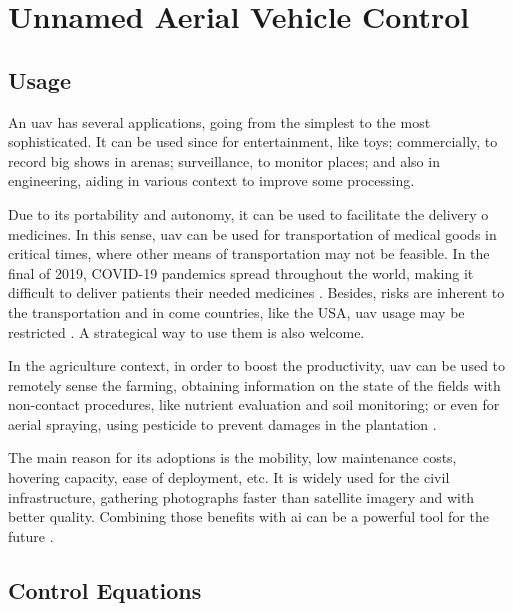 \section{Unnamed Aerial Vehicle Control}

\subsection{Usage}

An \gls*{uav} has several applications, going from the simplest to the most sophisticated. It can be used since for entertainment, like toys; commercially, to record big shows in arenas; surveillance, to monitor places; and also in engineering, aiding in various context to improve some processing.

Due to its portability and autonomy, it can be used to facilitate the delivery o medicines. In this sense, \gls*{uav} can be used for transportation of medical goods in critical times, where other means of transportation may not be feasible.
In the final of 2019, COVID-19 pandemics spread throughout the world, making it difficult to deliver patients their needed medicines \cite{ramakrishnan2023,mcphillips2022}.
Besides, risks are inherent to the transportation and in come countries, like the USA, \gls*{uav} usage may be restricted \citep{thiels2015}. 
A strategical way to use them is also welcome.

In the agriculture context, in order to boost the productivity, \gls*{uav} can be used to remotely sense the farming, obtaining information on the state of the fields with non-contact procedures, like nutrient evaluation and soil monitoring; or even for aerial spraying, using pesticide to prevent damages in the plantation \citep{delcerro2021}.

The main reason for its adoptions is the mobility, low maintenance costs, hovering capacity, ease of deployment, etc. 
It is widely used for the civil infrastructure, gathering photographs faster than  satellite imagery and with better quality. 
Combining those benefits with \gls*{ai} can be a powerful tool for the future \citep{sivakumar2021}. 


\subsection{Control Equations}

